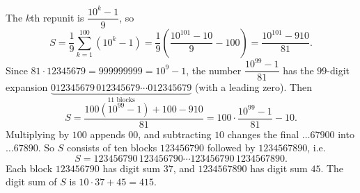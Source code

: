 The $k$th repunit is $\dfrac{10^k-1}{9}$, so
\[
S=\dfrac{1}{9}\sum_{k=1}^{100}(10^k-1)=\dfrac{1}{9}\left(\dfrac{10^{101}-10}{9}-100\right)=\dfrac{10^{101}-910}{81}.
\]
Since $81\cdot12345679=999999999=10^9-1$, the number $\dfrac{10^{99}-1}{81}$ has the $99$-digit expansion $\underbrace{012345679\,012345679\cdots012345679}_{11\text{ blocks}}$ (with a leading zero). Then
\[
S=\dfrac{100(10^{99}-1)+100-910}{81}=100\cdot\dfrac{10^{99}-1}{81}-10 .
\]
Multiplying by $100$ appends $00$, and subtracting $10$ changes the final $\ldots67900$ into $\ldots67890$. So $S$ consists of ten blocks $123456790$ followed by $1234567890$, i.e.
\[
S=123456790\,123456790\cdots123456790\,1234567890 .
\]
Each block $123456790$ has digit sum $37$, and $1234567890$ has digit sum $45$. The digit sum of $S$ is $10\cdot37+45=\boxed{415}$.
